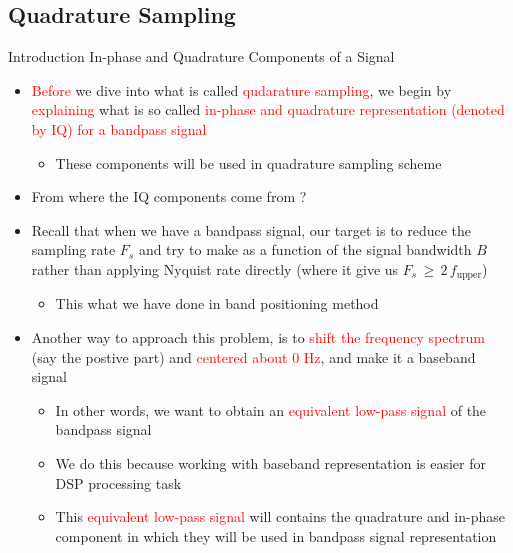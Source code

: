 \subsection{Quadrature Sampling}
\begin{frame}[t,allowframebreaks]{Introduction In-phase and Quadrature Components of a Signal}

\begin{itemize}

\item \textcolor{red}{Before} we dive into what is called \textcolor{red}{qudarature sampling}, we begin by \textcolor{red}{explaining} what is so called \textcolor{red}{in-phase and quadrature representation (denoted by IQ) for a bandpass signal}

	\begin{itemize}
	\item These components will be used in quadrature sampling scheme
	\end{itemize}

\item From where the IQ components come from ?

\item Recall that when we have a bandpass signal, our target is to reduce the sampling rate $F_s$ and try to make as a function of the signal bandwidth $B$ rather than applying Nyquist rate directly (where it give us $F_s \, \geq \, 2 \, f_{\text{upper}}$)

	\begin{itemize}
	\item This what we have done in band positioning method
	\end{itemize}

\newpage
\item Another way to approach this problem, is to \textcolor{red}{shift the frequency spectrum} (say the postive part) and \textcolor{red}{centered about 0 Hz}, and make it a baseband signal
	
	\begin{itemize}
	\item In other words, we want to obtain an \textcolor{red}{equivalent low-pass signal} of the bandpass signal
	
	\item We do this because working with baseband representation is easier for DSP processing task
	
	\item This \textcolor{red}{equivalent low-pass signal} will contains the quadrature and in-phase component in which they will be used in bandpass signal representation
	\end{itemize}

\end{itemize}

\end{frame}


